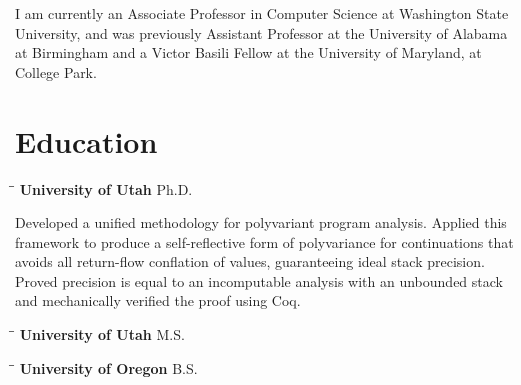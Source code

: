 \documentclass[line]{res}
\begin{document}
 


\address{\bf gilray.org 
\ \ \ \ \ \ \ \ } 
                                   
\begin{resume}         

\vspace{-0.1in}   
I am currently an Associate Professor in Computer Science at Washington State University, and was previously Assistant Professor at the University of Alabama at Birmingham and a Victor Basili Fellow at the University of Maryland, at College Park. 

\section{\large Education}            
    \vspace{-0.1cm}     
    \begin{tabbing} 
    \hspace{2.25in}\= \hspace{2.25in}\= \kill
    {\bf University of Utah} \>Ph.D.      
    \end{tabbing}\vspace{-0.5cm} 
    Developed a unified methodology for polyvariant program analysis. Applied this framework to produce a self-reflective form of polyvariance for continuations that avoids all return-flow conflation of values, guaranteeing ideal stack precision. Proved precision is equal to an incomputable analysis with an unbounded stack and mechanically verified the proof using Coq. 
    \vspace{-0.2cm}  
    \begin{tabbing} 
    \hspace{2.25in}\= \hspace{2.25in}\= \kill 
    {\bf University of Utah} \>M.S.       
    \end{tabbing}\vspace{-0.5cm} 
    \vspace{-0.2cm}  
    \begin{tabbing} 
    \hspace{2.25in}\= \hspace{2.25in}\= \kill 
    {\bf University of Oregon} \>B.S.     
    \end{tabbing}\vspace{-0.5cm} 

\vspace{0.1in} 

\end{resume}
\end{document}
